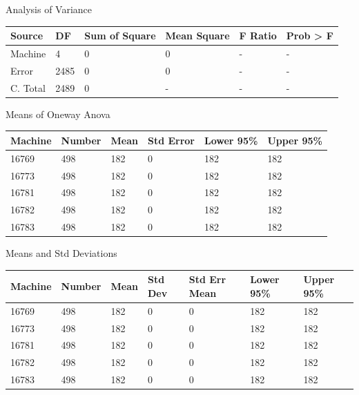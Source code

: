 \documentclass[12pt,twocolumn]{report}
\begin{document}
Analysis of Variance
\newline
\begin{tabular}{l | l | l | l | l | l}
Source&DF&Sum of Square&Mean Square&F Ratio&Prob > F \\
\hline
Machine&4&0&0&-&- \\
Error&2485&0&0&-&- \\
C. Total&2489&0&-&-&- \\
\end{tabular}
\newline

Means of Oneway Anova
\newline
\begin{tabular}{l | l | l | l | l | l}
Machine&Number&Mean&Std Error&Lower 95\%&Upper 95\% \\
\hline
16769&498&182&0&182&182 \\
16773&498&182&0&182&182 \\
16781&498&182&0&182&182 \\
16782&498&182&0&182&182 \\
16783&498&182&0&182&182 \\
\end{tabular}
\newline

Means and Std Deviations
\newline
\begin{tabular}{l | l | l | l | l | l | l}
Machine&Number&Mean&Std Dev&Std Err Mean&Lower 95\%&Upper 95\% \\
\hline
16769&498&182&0&0&182&182 \\
16773&498&182&0&0&182&182 \\
16781&498&182&0&0&182&182 \\
16782&498&182&0&0&182&182 \\
16783&498&182&0&0&182&182 \\
\end{tabular}
\newline
\end{document}
